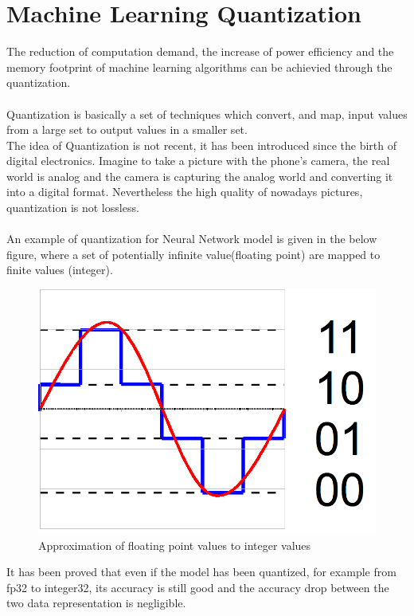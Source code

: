 \section{Machine Learning Quantization}
The reduction of computation demand, the increase of power efficiency and the memory footprint of machine learning algorithms can be achievied through the quantization.\\\\

Quantization is basically a set of techniques which convert, and map, input values from a large set to output values in a smaller set.\\The idea of Quantization is not recent, it has been introduced since the birth of digital electronics. Imagine to take a picture with the phone's camera, the real world is analog and the camera is capturing the analog world and converting it into a digital format.  Nevertheless the high quality of nowadays pictures, quantization is not lossless.\\\\
An example of quantization for Neural Network model is given in the below figure, where a set of potentially infinite value(floating point) are mapped to finite values (integer).
\begin{figure}[H]
\centering
\captionsetup{justification=centering}
\includegraphics[scale=0.4]{./figure/quant.png}
\caption{Approximation of floating point values to integer values}
\label{fig:quant}
\end{figure}
It has been proved that even if the model has been quantized, for example from fp32 to integer32, its accuracy is still good and the accuracy drop between the two data representation is negligible\cite{paper:8}.\\
